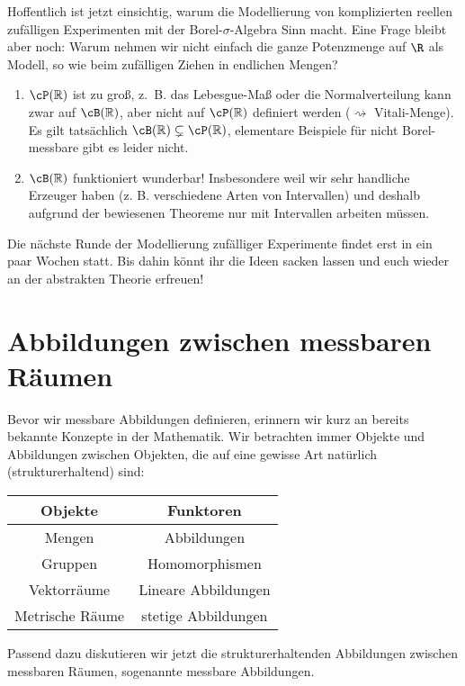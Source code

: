 Hoffentlich ist jetzt einsichtig, warum die Modellierung von komplizierten reellen zuf\"alligen Experimenten mit der Borel-$\sigma$-Algebra Sinn macht. Eine Frage bleibt aber noch: Warum nehmen wir nicht einfach die ganze Potenzmenge auf $\R$ als Modell, so wie beim zuf\"alligen Ziehen in endlichen Mengen?
\begin{bem}
	\begin{enumerate}[label=(\roman*)]
		\item $\cP(\mathbb{R})$ ist zu groß, \mbox{z. B.} das Lebesgue-Maß oder die Normalverteilung kann zwar auf $\cB(\mathbb{R})$, aber nicht auf $\cP(\mathbb{R})$ definiert werden ($\rightsquigarrow$ Vitali-Menge). Es gilt tats\"achlich $\cB(\mathbb{R}) \subsetneq \cP(\mathbb{R})$, elementare Beispiele f\"ur nicht Borel-messbare gibt es leider nicht.
		\item $\cB(\mathbb{R})$ funktioniert wunderbar! Insbesondere weil wir sehr handliche Erzeuger haben (z. B. verschiedene Arten von Intervallen) und deshalb aufgrund der bewiesenen Theoreme nur mit Intervallen arbeiten m\"ussen.
	\end{enumerate}
\end{bem}

Die n\"achste Runde der Modellierung zuf\"alliger Experimente findet erst in ein paar Wochen statt. Bis dahin k\"onnt ihr die Ideen sacken lassen und euch wieder an der abstrakten Theorie erfreuen!


\chapter{Abbildungen zwischen messbaren Räumen}
Bevor wir messbare Abbildungen definieren, erinnern wir kurz an bereits bekannte Konzepte in der Mathematik. Wir betrachten immer Objekte und Abbildungen zwischen Objekten, die auf eine gewisse Art \glqq nat\"urlich\grqq{} (strukturerhaltend) sind:
\begin{center}
\bgroup
\def\arraystretch{1}
 \begin{tabular}{c|c}
	Objekte& Funktoren\\ %
	\hline
	Mengen& Abbildungen\\
	Gruppen&Homomorphismen\\ 
	Vektorräume&Lineare Abbildungen\\
	Metrische Räume& stetige Abbildungen\\
\end{tabular}
\egroup
\end{center}
Passend dazu diskutieren wir jetzt die strukturerhaltenden Abbildungen zwischen messbaren R\"aumen, sogenannte messbare Abbildungen.
